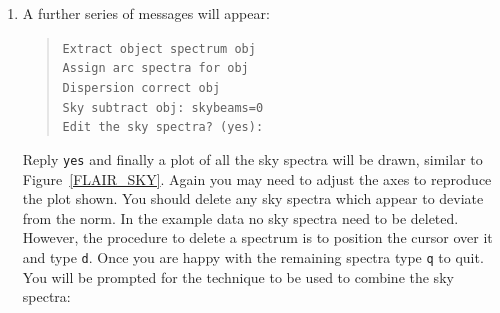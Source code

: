 \documentclass[twoside,11pt]{article}
\begin{document}
\begin{enumerate}
   You will then be prompted:

  \begin{quote}
   {\tt Fit dispersion function interactively? (no|yes|NO|YES) (NO):}
  \end{quote}

   Reply {\tt NO}.  {\tt dofibers} should display a list of line
   identifications and residuals:

  \begin{verbatim}
arcapid.t.ms - Ap 28    4/4     4/4       -1.08       -1.45  -3.5E-4 2.1E-11
arcapid.t.ms - Ap 23    4/4     4/4       0.269       0.361  8.66E-5 8.0E-11
arcapid.t.ms - Ap 10    3/4     3/3       0.963         1.3  3.09E-4 3.9E-12
arcapid.t.ms - Ap 8     4/4     4/4       0.904        1.22  2.91E-4 3.8E-11
arcapid.t.ms - Ap 32    4/4     4/4       -1.19       -1.61  -3.9E-4 1.2E-10
arcapid.t.ms - Ap 88    4/4     4/4      -0.285      -0.383  -9.3E-5 1.3E-10
arcapid.t.ms - Ap 90    4/4     4/4     -0.0497     -0.0663  -1.7E-5 4.0E-12
arcapid.t.ms - Ap 91    4/4     4/4      -0.789       -1.06  -2.6E-4 2.3E-12
arcapid.t.ms - Ap 92    4/4     4/4       -1.02       -1.37  -3.3E-4 6.7E-11
Dispersion correct arc arcapid.t.ms: w1 = 3893.338768145233, w2 = 4729.910906658071, dw =
1.323690092583605, nw = 633
\end{verbatim}

   and prompt:

  \begin{quote}
   {\tt Change wavelength coordinate assignments? (yes|no|NO):}
  \end{quote}

   Again reply {\tt NO}.

  \item A further series of messages will appear:

  \begin{quote}
   {\tt Extract object spectrum obj  \\
   Assign arc spectra for obj  \\
   Dispersion correct obj  \\
   Sky subtract obj:  skybeams=0  \\
   Edit the sky spectra? (yes):}
  \end{quote}

   Reply {\tt yes} and finally a plot of all the sky spectra will be
   drawn, similar to Figure~\ref{FLAIR_SKY}.  Again you may need to adjust
   the axes to reproduce the plot shown.  You should delete any sky spectra
   which appear to deviate from the norm.  In the example data no sky spectra
   need to be deleted.  However, the procedure to delete a spectrum is to
   position the cursor over it and type {\tt d}.  Once you are happy with
   the remaining spectra type {\tt q} to quit.  You will be prompted for the
   technique to be used to combine the sky spectra:


\end{enumerate}
\end{document}
